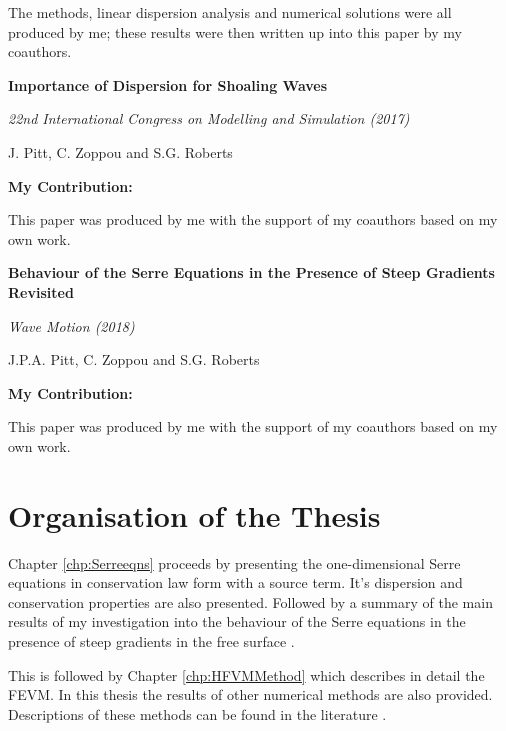 The methods, linear dispersion analysis and numerical solutions were all produced by me; these results were then written up into this paper by my coauthors. 

\vspace*{\baselineskip}
\begin{center}
	\textbf{
		\Large Importance of Dispersion for Shoaling Waves}
	
	\vspace*{\baselineskip}
	
	\textit{22nd International Congress on Modelling and Simulation (2017)}
	
	{J. Pitt, C. Zoppou and S.G. Roberts}
	\vspace*{0.5\baselineskip}
\end{center}
 \textbf{My Contribution:}
 
 This paper was produced by me with the support of my coauthors based on my own work.
 
 \vspace*{\baselineskip}
 
 \begin{center}
 	\textbf{
 		\Large Behaviour of the Serre Equations in the Presence of Steep Gradients Revisited}
 	
 	\vspace*{\baselineskip}
 	
 	\textit{Wave Motion (2018)}
 	
 	{J.P.A. Pitt, C. Zoppou and S.G. Roberts}
 	\vspace*{0.5\baselineskip}
 \end{center}
 \textbf{My Contribution:}
 
 This paper was produced by me with the support of my coauthors based on my own work.

\section{Organisation of the Thesis}
Chapter \ref{chp:Serreeqns} proceeds by presenting the one-dimensional Serre equations in conservation law form with a source term. It's dispersion and conservation properties are also presented. Followed by a summary of the main results of my investigation into the behaviour of the Serre equations in the presence of steep gradients in the free surface \cite{Pitt-2018-61}.

This is followed by Chapter \ref{chp:HFVMMethod} which describes in detail the FEVM. In this thesis the results of other numerical methods are also provided. Descriptions of these methods can be found in the literature \cite{Zoppou-etal-2017,Pitt-2018-61}. 

